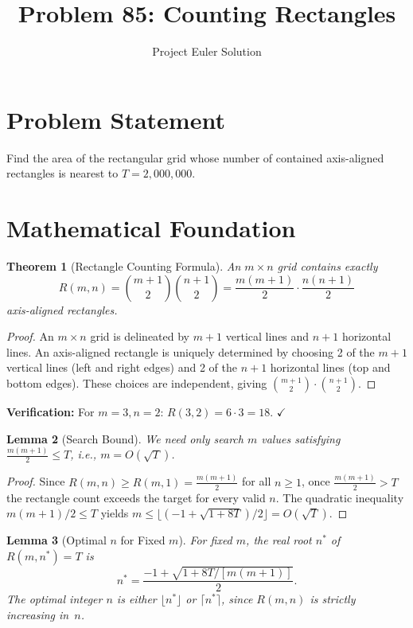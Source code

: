 \documentclass[12pt]{article}
\title{Problem 85: Counting Rectangles}
\author{Project Euler Solution}
\date{}
\newtheorem{theorem}{Theorem}
\newtheorem{lemma}[theorem]{Lemma}
\begin{document}
\maketitle

\section{Problem Statement}

Find the area of the rectangular grid whose number of contained axis-aligned rectangles is nearest to $T = 2{,}000{,}000$.

\section{Mathematical Foundation}

\begin{theorem}[Rectangle Counting Formula]
An $m \times n$ grid contains exactly
\[
R(m, n) = \binom{m+1}{2} \binom{n+1}{2} = \frac{m(m+1)}{2} \cdot \frac{n(n+1)}{2}
\]
axis-aligned rectangles.
\end{theorem}

\begin{proof}
An $m \times n$ grid is delineated by $m+1$ vertical lines and $n+1$ horizontal lines. An axis-aligned rectangle is uniquely determined by choosing 2 of the $m+1$ vertical lines (left and right edges) and 2 of the $n+1$ horizontal lines (top and bottom edges). These choices are independent, giving $\binom{m+1}{2} \cdot \binom{n+1}{2}$.
\end{proof}

\textbf{Verification:} For $m = 3, n = 2$: $R(3,2) = 6 \cdot 3 = 18$. $\checkmark$

\begin{lemma}[Search Bound]
We need only search $m$ values satisfying $\frac{m(m+1)}{2} \leq T$, i.e., $m = O(\sqrt{T})$.
\end{lemma}

\begin{proof}
Since $R(m, n) \geq R(m, 1) = \frac{m(m+1)}{2}$ for all $n \geq 1$, once $\frac{m(m+1)}{2} > T$ the rectangle count exceeds the target for every valid $n$. The quadratic inequality $m(m+1)/2 \le T$ yields $m \le \lfloor(-1 + \sqrt{1 + 8T})/2\rfloor = O(\sqrt{T})$.
\end{proof}

\begin{lemma}[Optimal $n$ for Fixed $m$]
For fixed $m$, the real root $n^*$ of $R(m, n^*) = T$ is
\[
n^* = \frac{-1 + \sqrt{1 + 8T/[m(m+1)]}}{2}.
\]
The optimal integer $n$ is either $\lfloor n^* \rfloor$ or $\lceil n^* \rceil$, since $R(m,n)$ is strictly increasing in~$n$.
\end{lemma}
\end{document}
